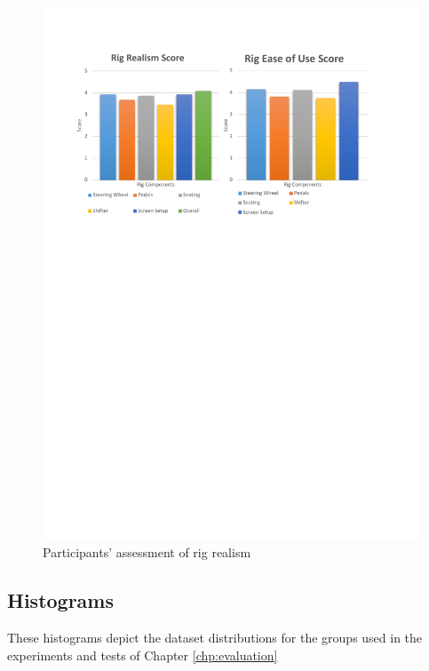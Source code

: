 \begin{figure}[!htb]
	\centering
	\includegraphics[width=\textwidth]{charts/rigRealisim.pdf}
	\caption[Participants' assessment of rig realism]{Participants' assessment of rig realism}
	\label{fig:chart-realistic}
\end{figure}

\subsection{Histograms}
These histograms depict the dataset distributions for the groups used in the experiments and tests of Chapter \ref{chp:evaluation}

